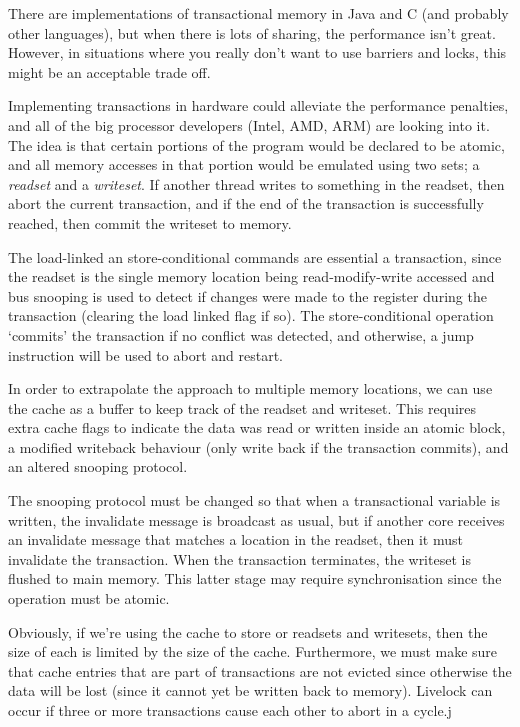 There are implementations of transactional memory in Java and C (and
probably other languages), but when there is lots of sharing, the
performance isn't great. However, in situations where you really don't
want to use barriers and locks, this might be an acceptable trade off.

Implementing transactions in hardware could alleviate the performance
penalties, and all of the big processor developers (Intel, AMD, ARM)
are looking into it. The idea is that certain portions of the program
would be declared to be atomic, and all memory accesses in that
portion would be emulated using two sets; a \textit{readset} and
a \textit{writeset}. If another thread writes to something in the
readset, then abort the current transaction, and if the end of the
transaction is successfully reached, then commit the writeset to
memory.

The load-linked an store-conditional commands are essential a
transaction, since the readset is the single memory location being
read-modify-write accessed and bus snooping is used to detect if
changes were made to the register during the transaction (clearing the
load linked flag if so). The store-conditional operation `commits' the
transaction if no conflict was detected, and otherwise, a jump
instruction will be used to abort and restart.

In order to extrapolate the approach to multiple memory locations, we
can use the cache as a buffer to keep track of the readset and
writeset. This requires extra cache flags to indicate the data was
read or written inside an atomic block, a modified writeback behaviour
(only write back if the transaction commits), and an altered snooping
protocol.

The snooping protocol must be changed so that when a transactional
variable is written, the invalidate message is broadcast as usual, but
if another core receives an invalidate message that matches a location
in the readset, then it must invalidate the transaction. When the
transaction terminates, the writeset is flushed to main memory. This
latter stage may require synchronisation since the operation must be
atomic.

Obviously, if we're using the cache to store or readsets and
writesets, then the size of each is limited by the size of the
cache. Furthermore, we must make sure that cache entries that are part
of transactions are not evicted since otherwise the data will be lost
(since it cannot yet be written back to memory). Livelock can occur if
three or more transactions cause each other to abort in a cycle.j

